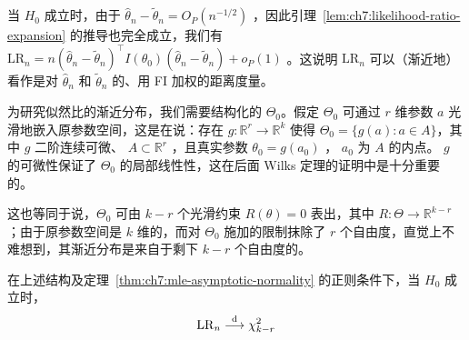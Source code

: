当 $H_0$ 成立时，由于 $\widehat\theta_n-\widetilde\theta_n=O_P(n^{-1/2})$ ，因此引理~\ref{lem:ch7:likelihood-ratio-expansion} 的推导也完全成立，我们有 $\mathrm{LR}_n=n(\widehat\theta_n-\widetilde\theta_n)^\top I(\theta_0)(\widehat\theta_n-\widetilde\theta_n)+o_P(1)$ 。这说明 $\mathrm{LR}_n$ 可以（渐近地）看作是对 $\widehat\theta_n$ 和 $\widetilde\theta_n$ 的、用 FI 加权的距离度量。

为研究似然比的渐近分布，我们需要结构化的 $\Theta_0$。假定 $\Theta_0$ 可通过 $r$ 维参数 $a$ 光滑地嵌入原参数空间，这是在说：存在 $g: \mathbb{R}^r \to \mathbb{R}^k$ 使得 $\Theta_0 = \{ g(a) : a \in A \}$，其中 $g$ 二阶连续可微、 $A\subset\mathbb R^r$ ，且真实参数 $\theta_0 = g(a_0)$ ， $a_0$ 为 $A$ 的内点。 $g$ 的可微性保证了 $\Theta_0$ 的局部线性性，这在后面 Wilks 定理的证明中是十分重要的。

这也等同于说，$\Theta_0$ 可由 $k-r$ 个光滑约束 $R(\theta)=0$ 表出，其中 $R:\Theta\to\mathbb R^{k-r}$ ；由于原参数空间是 $k$ 维的，而对 $\Theta_0$ 施加的限制抹除了 $r$ 个自由度，直觉上不难想到，其渐近分布是来自于剩下 $k-r$ 个自由度的。

\begin{theorem}[Wilks 定理]
\label{thm:ch7:wilks}

在上述结构及定理~\ref{thm:ch7:mle-asymptotic-normality} 的正则条件下，当 $H_0$ 成立时，
\[\mathrm{LR}_n \overset{\rm d}\longrightarrow \chi^2_{k-r}\]
\end{theorem}

